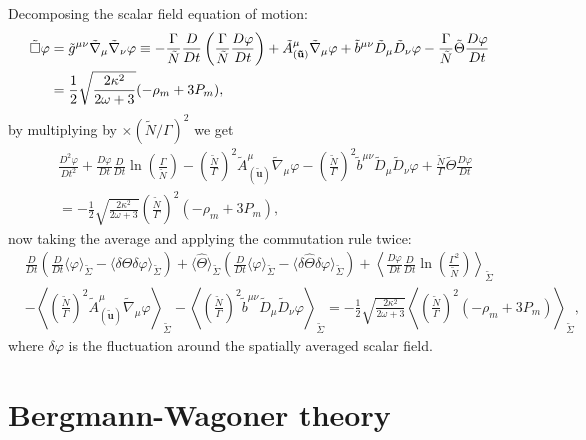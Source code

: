 Decomposing the scalar field equation of motion:
\begin{align}
    \Tilde{\Box}\varphi&=\tilde{g}^{\mu\nu}\tilde{\nabla}_\mu\tilde{\nabla}_\nu\varphi\equiv -\frac{\Gamma}{\tilde{N}}\frac{D}{Dt}\left(\frac{\Gamma}{\tilde{N}}\frac{D\varphi}{Dt}\right)+\tilde{A}^\mu_{(\mathbf{\tilde{u}})} \tilde{\nabla}_\mu\varphi +\tilde{b}^{\mu\nu}\tilde{D}_\mu\tilde{D}_\nu\varphi-\frac{\Gamma}{\tilde{N}}\tilde{\Theta}\frac{D\varphi}{Dt}\\
    &=\frac{1}{2}\sqrt{\frac{2\kappa^2}{2\omega+3}}(-\rho_m+3P_m),
\end{align}
by multiplying by $\times (\tilde{N}/\Gamma)^2$ we get
\begin{align}
    &\frac{D^2\varphi}{Dt^2}+\frac{D\varphi}{Dt}\frac{D}{Dt}\ln\left(\frac{\Gamma}{\tilde{N}}\right)-\left(\frac{\tilde{N}}{\Gamma}\right)^2\tilde{A}^\mu_{(\mathbf{\tilde{u}})} \tilde{\nabla}_\mu\varphi -\left(\frac{\tilde{N}}{\Gamma}\right)^2\tilde{b}^{\mu\nu}\tilde{D}_\mu\tilde{D}_\nu\varphi+\frac{\tilde{N}}{\Gamma}\tilde{\Theta}\frac{D\varphi}{Dt}\\
    &=-\frac{1}{2}\sqrt{\frac{2\kappa^2}{2\omega+3}}\left(\frac{\tilde{N}}{\Gamma}\right)^2(-\rho_m+3P_m),
\end{align}
now taking the average and applying the commutation rule twice:
\begin{align}
    &\frac{D}{Dt}\left(\frac{D}{Dt}\langle\varphi\rangle_{\tilde{\Sigma}}-\langle\delta\hat{\Theta}\delta\varphi\rangle_{\tilde{\Sigma}}\right)+\langle\hat{\Theta}\rangle_{\tilde{\Sigma}} \left(\frac{D}{Dt}\langle\varphi\rangle_{\tilde{\Sigma}}-\langle\delta\hat{\Theta}\delta\varphi\rangle_{\tilde{\Sigma}}\right) +\left\langle\frac{D\varphi}{Dt}\frac{D}{Dt}\ln\left(\frac{\Gamma^2}{\tilde{N}}\right)\right\rangle_{\tilde{\Sigma}}\\
    &-\left\langle\left(\frac{\tilde{N}}{\Gamma}\right)^2\tilde{A}^\mu_{(\mathbf{\tilde{u}})} \tilde{\nabla}_\mu\varphi\right\rangle_{\tilde{\Sigma}} -\left\langle \left(\frac{\tilde{N}}{\Gamma}\right)^2\tilde{b}^{\mu\nu}\tilde{D}_\mu\tilde{D}_\nu \varphi \right\rangle_{\tilde{\Sigma}}=-\frac{1}{2}\sqrt{\frac{2\kappa^2}{2\omega+3}}\left\langle\left(\frac{\tilde{N}}{\Gamma}\right)^2(-\rho_m+3P_m)\right\rangle_{\tilde{\Sigma}},\nonumber
\end{align}
where $\delta\varphi$ is the fluctuation around the spatially averaged scalar field.





\section{Bergmann-Wagoner theory}





